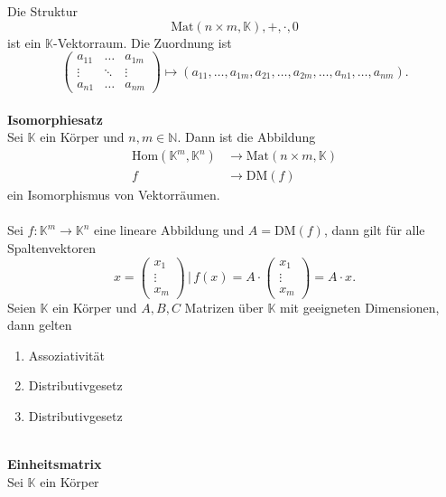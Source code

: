 \documentclass[a4paper,12pt]{article}
\newcommand{\RN}[1]{\uppercase\expandafter{\romannumeral#1}}
\begin{document}
Die Struktur 
\[ 
        \text{Mat}\left(n\times m,\mathbb{K}\right),+,\cdot ,0
\] 
ist ein $\mathbb{K}$-Vektorraum. Die Zuordnung ist
\[ 
        \left(\begin{matrix}
                        a_{11}&\hdots &a_{1m}\\\vdots&\ddots&\vdots\\a_{n1}&\hdots &a_{nm}
        \end{matrix}\right)\mapsto\left(a_{11},\hdots ,a_{1m},a_{21},\hdots ,a_{2m},\hdots ,a_{n1},\hdots ,a_{nm}\right)
.\] 
\hfill\\\textbf{Isomorphiesatz}\\ 
Sei $\mathbb{K}$ ein Körper und $n,m \in \mathbb{N}$. Dann ist die Abbildung
\begin{align*}
        \text{Hom}\left(\mathbb{K}^{m},\mathbb{K}^{n}\right)&\rightarrow \text{Mat}\left(n\times m,\mathbb{K}\right)\\
        f&\rightarrow \text{DM}\left(f\right)
\end{align*}
ein Isomorphismus von Vektorräumen.\\\\
Sei $f:\mathbb{K}^{m}\rightarrow \mathbb{K}^{n}$ eine lineare Abbildung und $A=\text{DM}\left(f\right)$, dann gilt für alle Spaltenvektoren
\[ 
        x=\left(\begin{matrix}
                x_1\\\vdots \\x_m
        \end{matrix}\right)\,|\, f\left(x\right)=A\cdot \left(\begin{matrix}
                x_1\\\vdots\\x_m
        \end{matrix}\right)=A\cdot x
.\] 
Seien $\mathbb{K}$ ein Körper und $A,B,C$ Matrizen über $\mathbb{K}$ mit geeigneten Dimensionen, dann gelten
\begin{enumerate}[label=(\alph*)]
        \item Assoziativität
        \item Distributivgesetz \RN1
        \item Distributivgesetz \RN2
\end{enumerate}
\hfill\\\textbf{Einheitsmatrix}\\ 
Sei $\mathbb{K}$ ein Körper
\end{document}
